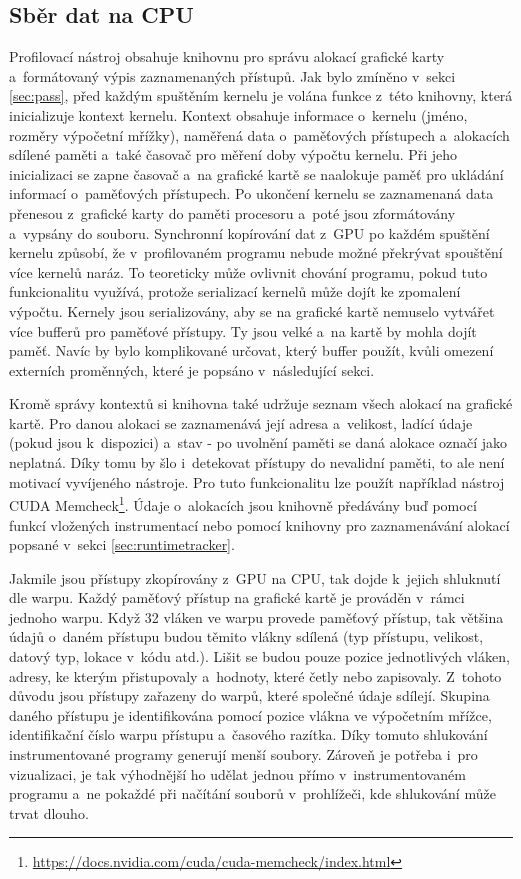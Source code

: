 \subsection{Sběr dat na CPU}
\label{sec:cpucollection}
Profilovací nástroj obsahuje knihovnu pro správu alokací grafické karty a~formátovaný výpis zaznamenaných přístupů. Jak bylo zmíněno v~sekci \ref{sec:pass}, před každým spuštěním kernelu je volána funkce z~této knihovny, která inicializuje kontext kernelu. Kontext obsahuje informace o~kernelu (jméno, rozměry výpočetní mřížky), naměřená data o~paměťových přístupech a~alokacích sdílené paměti a~také časovač pro měření doby výpočtu kernelu. Při jeho inicializaci se zapne časovač a~na grafické kartě se naalokuje paměť pro ukládání informací o~paměťových přístupech. Po ukončení kernelu se zaznamenaná data přenesou z~grafické karty do paměti procesoru a~poté jsou zformátovány a~vypsány do souboru. 
Synchronní kopírování dat z~GPU po každém spuštění kernelu způsobí, že v~profilovaném programu nebude možné překrývat spouštění více kernelů naráz. To teoreticky může ovlivnit chování programu, pokud tuto funkcionalitu využívá, protože serializací kernelů může dojít ke zpomalení výpočtu. Kernely jsou serializovány, aby se na grafické kartě nemuselo vytvářet více bufferů pro paměťové přístupy. Ty jsou velké a~na kartě by mohla dojít paměť. Navíc by bylo komplikované určovat, který buffer použít, kvůli omezení externích proměnných, které je popsáno v~následující sekci.

Kromě správy kontextů si knihovna také udržuje seznam všech alokací na grafické kartě. Pro danou alokaci se zaznamenává její adresa a~velikost, ladící údaje (pokud jsou k~dispozici) a~stav - po uvolnění paměti se daná alokace označí jako neplatná. Díky tomu by šlo i~detekovat přístupy do nevalidní paměti, to ale není motivací vyvíjeného nástroje. Pro tuto funkcionalitu lze použít například nástroj CUDA Memcheck\footnote{\url{https://docs.nvidia.com/cuda/cuda-memcheck/index.html}}. Údaje o~alokacích jsou knihovně předávány buď pomocí funkcí vložených instrumentací nebo pomocí knihovny pro zaznamenávání alokací popsané v~sekci \ref{sec:runtimetracker}.

Jakmile jsou přístupy zkopírovány z~GPU na CPU, tak dojde k~jejich shluknutí dle warpu. Každý paměťový přístup na grafické kartě je prováděn v~rámci jednoho warpu. Když 32 vláken ve warpu provede paměťový přístup, tak většina údajů o~daném přístupu budou těmito vlákny sdílená (typ přístupu, velikost, datový typ, lokace v~kódu atd.). Lišit se budou pouze pozice jednotlivých vláken, adresy, ke kterým přistupovaly a~hodnoty, které četly nebo zapisovaly. Z~tohoto důvodu jsou přístupy zařazeny do warpů, které společné údaje sdílejí. Skupina daného přístupu je identifikována pomocí pozice vlákna ve výpočetním mřížce, identifikační číslo warpu přístupu a~časového razítka. Díky tomuto shlukování instrumentované programy generují menší soubory. Zároveň je potřeba i~pro vizualizaci, je tak výhodnější ho udělat jednou přímo v~instrumentovaném programu a~ne pokaždé při načítání souborů v~prohlížeči, kde shlukování může trvat dlouho.

